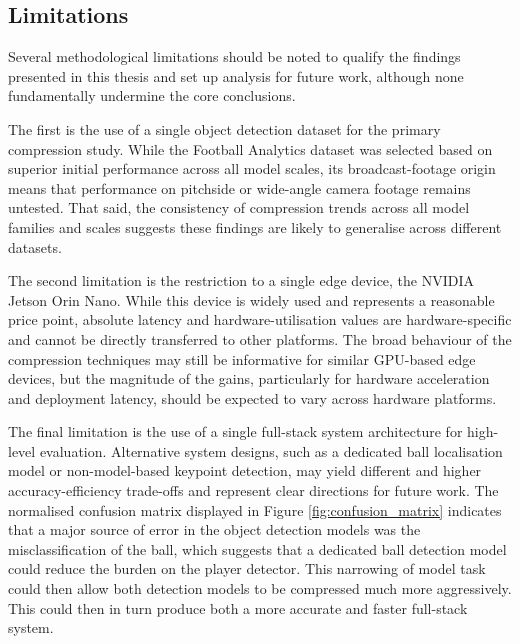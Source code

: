 \subsection{Limitations}

Several methodological limitations should be noted to qualify the findings presented in this thesis and set up analysis for future work, although none fundamentally undermine the core conclusions.

The first is the use of a single object detection dataset for the primary compression study. While the Football Analytics dataset was selected based on superior initial performance across all model scales, its broadcast-footage origin means that performance on pitchside or wide-angle camera footage remains untested. That said, the consistency of compression trends across all model families and scales suggests these findings are likely to generalise across different datasets.

The second limitation is the restriction to a single edge device, the NVIDIA Jetson Orin Nano. While this device is widely used and represents a reasonable price point, absolute latency and hardware-utilisation values are hardware-specific and cannot be directly transferred to other platforms. The broad behaviour of the compression techniques may still be informative for similar GPU-based edge devices, but the magnitude of the gains, particularly for hardware acceleration and deployment latency, should be expected to vary across hardware platforms.

The final limitation is the use of a single full-stack system architecture for high-level evaluation. Alternative system designs, such as a dedicated ball localisation model or non-model-based keypoint detection, may yield different and higher accuracy-efficiency trade-offs and represent clear directions for future work. The normalised confusion matrix displayed in Figure \ref{fig:confusion_matrix} indicates that a major source of error in the object detection models was the misclassification of the ball, which suggests that a dedicated ball detection model could reduce the burden on the player detector. This narrowing of model task could then allow both detection models to be compressed much more aggressively. This could then in turn produce both a more accurate and faster full-stack system.
